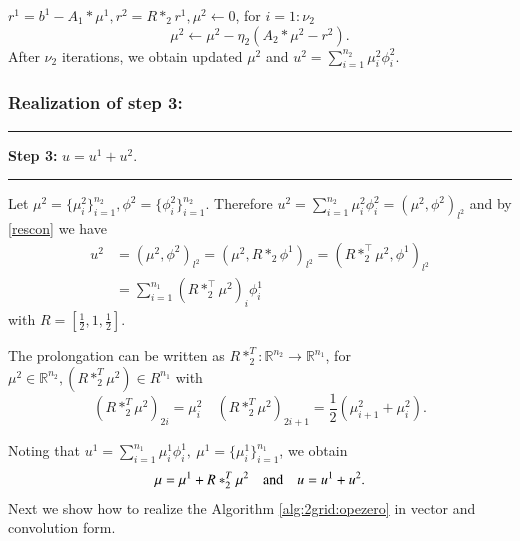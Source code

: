 $r^1=b^1-A_1\ast\mu^1, r^2=R\ast_2r^1, \mu^2\leftarrow 0$,
for $i=1:\nu_2 $ 
\begin{equation}
\mu^2\leftarrow \mu^2-\eta_2(A_2\ast \mu^2-r^2). 
\end{equation}
After $\nu_2$ iterations, we obtain updated $\mu^2$ and $\displaystyle  u^2=\sum_{i=1}^{n_2}\mu^2_{i}\phi_i^2$.

\subsubsection{Realization of step 3:} 
\smallskip\hrule \smallskip 
{\bf Step 3:}  $u=u^1+u^2$. 
\smallskip\hrule \smallskip 

Let $\displaystyle  \mu^2=\{\mu^2_{i}\}^{n_2}_{i=1}, \phi^{2}=\{\phi^2_i\}^{n_2}_{i=1}$.
Therefore  $u^2=\sum\limits_{i=1}^{n_2}\mu^2_{i}\phi^2_i
=(\mu^2, \phi^2)_{l^2}$ and by \eqref{rescon} we have
\begin{equation}
\begin{split}
u^2&=(\mu^2, \phi^2)_{l^2}=(\mu^2, R\ast_2\phi^1)_{l^2}=(R\ast_2^{\top}  \mu^2,  \phi^1)_{l^2}\\
&=\sum_{i=1}^{n_1}\left(R\ast_2^{\top} \mu^2\right)_i \phi^1_i
\end{split}
\end{equation}
with $R=[\frac 12,1,\frac12]$.
\begin{lemma}
The prolongation can be written as 
$R\ast_2^T: \mathbb R^{n_2}\rightarrow \mathbb R^{n_1}$, for $\mu^2\in \mathbb R^{n_2}, (R\ast_2^T \mu^2)\in R^{n_1}$ with
$$
(R\ast_2^T \mu^2)_{2i}=\mu^2_i\quad (R\ast_2^T \mu^2)_{2i+1}=\frac 12 (\mu^2_{i+1} +\mu^2_{i}).
$$
\end{lemma}
Noting that $\displaystyle u^1=\sum_{i=1}^{n_1}\mu^1_i\phi_i^1,~\mu^1=\{\mu^1_i\}^{n_1}_{i=1}$, we obtain 
$$
\mu=\mu^1+R\ast_2^T \mu^2\quad\hbox{and}\quad u=u^1+u^2.
$$
Next we show how to realize the Algorithm \ref{alg:2grid:opezero} in vector and convolution form.
%
%
%

